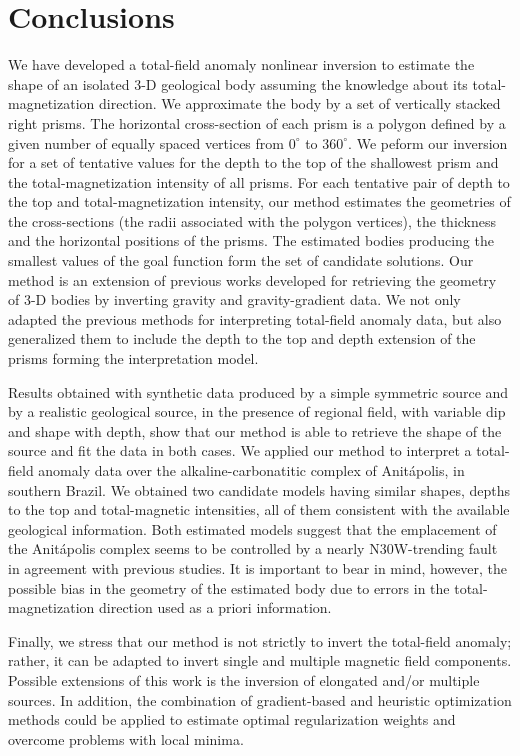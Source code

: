 \section{Conclusions}

We have developed a total-field anomaly nonlinear inversion to estimate the shape 
of an isolated 3-D geological body assuming the knowledge about its 
total-magnetization direction. We approximate the body by a set of vertically 
stacked right prisms. The horizontal cross-section of each prism is a polygon 
defined by a given number of equally spaced vertices from $0^\circ$ to $360^\circ$. 
We peform our inversion for a set of tentative values for the depth to the top 
of the shallowest prism and the total-magnetization intensity of all prisms. 
For each tentative pair of depth to the top and total-magnetization intensity,
our method estimates the geometries of the cross-sections (the radii associated with the polygon vertices), the thickness and the horizontal positions of the prisms. 
The estimated bodies producing the smallest values of the goal function form the 
set of candidate solutions.
Our method is an extension of previous works developed for retrieving the geometry 
of 3-D bodies by inverting gravity and gravity-gradient data. 
We not only adapted the previous methods for interpreting total-field anomaly data,
but also generalized them to include the depth to the top and depth extension of 
the prisms forming the interpretation model.

Results obtained with synthetic data produced by a simple symmetric source 
and by a realistic geological source, in the presence of regional field, 
with variable dip and shape with depth, show that our method is able to retrieve 
the shape of the source and fit the data in both cases.
We applied our method to interpret a total-field anomaly data over the 
alkaline-carbonatitic complex of Anit{\'a}polis, in southern Brazil. 
We obtained two candidate models having similar shapes, depths to the top and 
total-magnetic intensities, all of them consistent with the available 
geological information. 
Both estimated models suggest that the emplacement of the 
Anit{\'a}polis complex seems to be controlled by a nearly N30W-trending fault
in agreement with previous studies.
It is important to bear in mind, however, the possible bias in the geometry of the
estimated body due to errors in the total-magnetization direction used as 
a priori information.

Finally, we stress that our method is not strictly to invert the total-field anomaly; 
rather, it can be adapted to invert single and multiple magnetic field components. 
Possible extensions of this work is the inversion of elongated and/or multiple 
sources. 
In addition, the combination of gradient-based and heuristic optimization 
methods could be applied to estimate optimal regularization weights and 
overcome problems with local minima.
